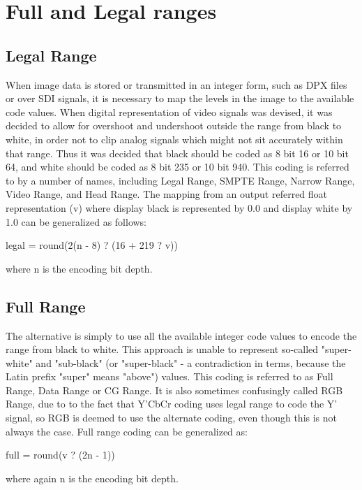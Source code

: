\section{Full and Legal ranges}%
\label{sec:full-and-legal-ranges}

\subsection{Legal Range}%
\label{subsec:legal-range}

When image data is stored or transmitted in an integer form, such as DPX files or over SDI signals, it is necessary to map the levels in the image to the available code values. When digital representation of video signals was devised, it was decided to allow for overshoot and undershoot outside the range from black to white, in order not to clip analog signals which might not sit accurately within that range. Thus it was decided that black should be coded as 8 bit 16 or 10 bit 64, and white should be coded as 8 bit 235 or 10 bit 940. This coding is referred to by a number of names, including Legal Range, SMPTE Range, Narrow Range, Video Range, and Head Range. The mapping from an output referred float representation (v) where display black is represented by 0.0 and display white by 1.0 can be generalized as follows:

	legal = round(2(n - 8) ? (16 + 219 ? v))

where n is the encoding bit depth.

\subsection{Full Range}%
\label{subsec:full-range}

The alternative is simply to use all the available integer code values to encode the range from black to white. This approach is unable to represent so-called "super-white" and "sub-black" (or "super-black" - a contradiction in terms, because the Latin prefix "super" means "above") values. This coding is referred to as Full Range, Data Range or CG Range. It is also sometimes confusingly called RGB Range, due to to the fact that Y'CbCr coding uses legal range to code the Y' signal, so RGB is deemed to use the alternate coding, even though this is not always the case. Full range coding can be generalized as:

	full = round(v ? (2n - 1))

where again n is the encoding bit depth.

